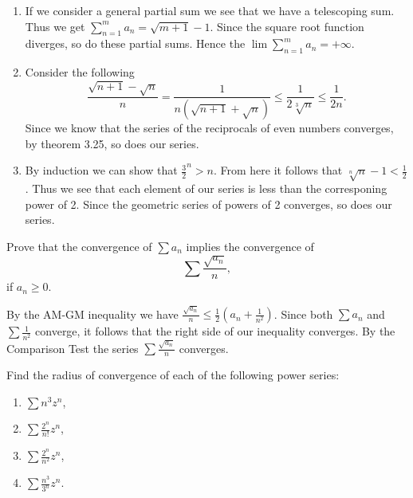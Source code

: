 \begin{solution}
  \begin{enumerate}[label=(\alph*)]
    \item If we consider a general partial sum we see that we have a telescoping sum.
      Thus we get $\sum_{n = 1}^m a_n = \sqrt{m + 1} - 1$.
      Since the square root function diverges, so do these partial sums.
      Hence the $\lim \sum_{n = 1}^{m} a_n = + \infty$.
    \item Consider the following
      \[\frac{\sqrt{n + 1} - \sqrt{n}}{n} = \frac{1}{n (\sqrt{n + 1} + \sqrt{n})} \le \frac{1}{2 \sqrt[3]{n}} \le \frac{1}{2 n}.\]
      Since we know that the series of the reciprocals of even numbers converges, by theorem 3.25, so does our series.
    \item By induction we can show that $\frac{3}{2}^n > n$.
      From here it follows that $\sqrt[n]{n} - 1 < \frac{1}{2}$.
      Thus we see that each element of our series is less than the corresponing power of 2.
      Since the geometric series of powers of 2 converges, so does our series.
  \end{enumerate}
\end{solution}

\begin{problem}
  Prove that the convergence of $\sum a_n$ implies the convergence of
  \[\sum \frac{\sqrt{a_n}}{n},\]
  if $a_n \ge 0$.
\end{problem}

\begin{solution}
  By the AM-GM inequality we have $\frac{\sqrt{a_n}}{n} \le \frac{1}{2} (a_n + \frac{1}{n^2})$.
  Since both $\sum a_n$ and $\sum \frac{1}{n^2}$ converge, it follows that the right side of our inequality converges.
  By the Comparison Test the series $\sum \frac{\sqrt{a_n}}{n}$ converges.
\end{solution}

\begin{problem}
  Find the radius of convergence of each of the following power series:
  \begin{enumerate}[label=(\alph*)]
    \item $\sum n^3 z^n$,
    \item $\sum \frac{2^n}{n!} z^n$,
    \item $\sum \frac{2^n}{n^2} z^n$,
    \item $\sum \frac{n^3}{3^n} z^n$.
  \end{enumerate}
\end{problem}

